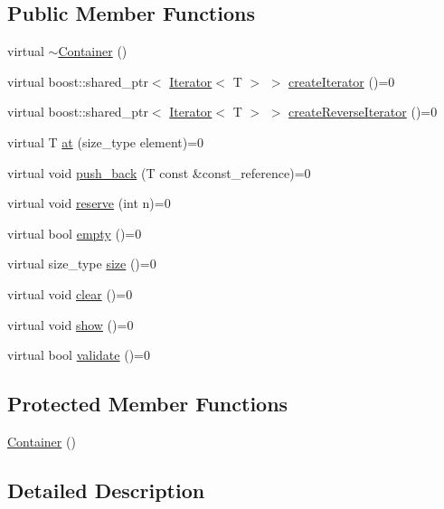 \subsection*{Public Member Functions}
\begin{DoxyCompactItemize}
\item 
virtual \hyperlink{class_container_ac190e8e99e5a92ef02390027765cbbb6}{$\sim$Container} ()
\item 
virtual boost::shared\_\-ptr$<$ \hyperlink{class_iterator}{Iterator}$<$ T $>$ $>$ \hyperlink{class_container_a18a0a70153781d3d94526bc09fcbedb8}{createIterator} ()=0
\item 
virtual boost::shared\_\-ptr$<$ \hyperlink{class_iterator}{Iterator}$<$ T $>$ $>$ \hyperlink{class_container_acc5e862abc8a449fe5c69c94eff4113e}{createReverseIterator} ()=0
\item 
virtual T \hyperlink{class_container_a8aed06783f7cd0749f796c64e64626e7}{at} (size\_\-type element)=0
\item 
virtual void \hyperlink{class_container_a12ffe2d2dbbcd78b6b293756004bd6e0}{push\_\-back} (T const \&const\_\-reference)=0
\item 
virtual void \hyperlink{class_container_a5f70fb0d821a8db9a0733aafe9ef35ac}{reserve} (int n)=0
\item 
virtual bool \hyperlink{class_container_a123dcd25b363ab92ac8bfa8b4c4061a4}{empty} ()=0
\item 
virtual size\_\-type \hyperlink{class_container_a1eebc7b5cbb0c574cb1aef87c2ddba36}{size} ()=0
\item 
virtual void \hyperlink{class_container_ac27f3554d6ac6ecb227ead060ff1f8a2}{clear} ()=0
\item 
virtual void \hyperlink{class_container_a5ee85af656e60863a7e4c1f7f9c484f4}{show} ()=0
\item 
virtual bool \hyperlink{class_container_abbd8ca2714a550351442f4410cf5736d}{validate} ()=0
\end{DoxyCompactItemize}
\subsection*{Protected Member Functions}
\begin{DoxyCompactItemize}
\item 
\hyperlink{class_container_ab17ce1f67243b28abcd4c8113a72524c}{Container} ()
\end{DoxyCompactItemize}


\subsection{Detailed Description}
